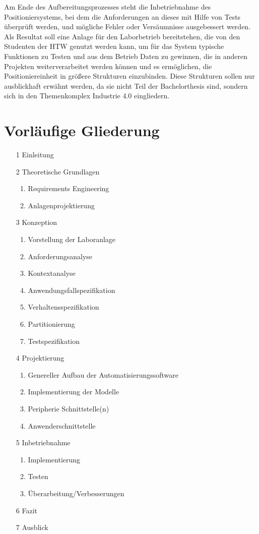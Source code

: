 \documentclass[12pt, a4paper, twoside]{article} %
\begin{document}
Am Ende des Aufbereitungsprozesses steht die Inbetriebnahme des Positioniersystems, bei dem die Anforderungen an dieses mit Hilfe von Tests überprüft werden, und mögliche Fehler oder Versäumnisse ausgebessert werden. Als Resultat soll eine Anlage für den Laborbetrieb bereitstehen, die von den Studenten der HTW genutzt werden kann, um für das System typische Funktionen zu Testen und aus dem Betrieb Daten zu gewinnen, die in anderen Projekten weiterverarbeitet werden können und es ermöglichen, die Positioniereinheit in größere Strukturen einzubinden. Diese Strukturen sollen nur ausblickhaft erwähnt werden, da sie nicht Teil der Bachelorthesis sind, sondern sich in den Themenkomplex Industrie 4.0 eingliedern.

\section{Vorläufige Gliederung}
\begin{itemize}
	\item[1] Einleitung
	\item[2] Theoretische Grundlagen
	\begin{enumerate}[label*=\arabic*.]
		\item Requirements Engineering
		\item Anlagenprojektierung
	\end{enumerate}
	\item[3] Konzeption
	\begin{enumerate}[label*=\arabic*.]
		\item Vorstellung der Laboranlage
		\item Anforderungsanalyse
		\item Kontextanalyse
		\item Anwendungsfallspezifikation
		\item Verhaltensspezifikation
		\item Partitionierung
		\item Testspezifikation
	\end{enumerate}
	\item[4] Projektierung
	\begin{enumerate}[label*=\arabic*.]
		\item Genereller Aufbau der Automatisierungssoftware
		\item Implementierung der Modelle
		\item Peripherie Schnittstelle(n)
		\item Anwenderschnittstelle
	\end{enumerate}
	\item[5] Inbetriebnahme
	\begin{enumerate}[label*=\arabic*.]
		\item Implementierung
		\item Testen
		\item Überarbeitung/Verbesserungen
	\end{enumerate} 
	\item[6] Fazit
	\item[7] Ausblick
\end{itemize}
\end{document}
